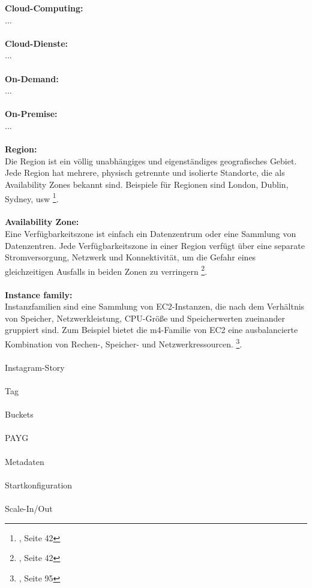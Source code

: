 

\textbf{Cloud-Computing:}\\
...
\\\\
\textbf{Cloud-Dienste:}\\
...
\\\\
\textbf{On-Demand:}\\
...
\\\\
\textbf{On-Premise:}\\
...
\\\\
\textbf{Region:}\\
Die Region ist ein völlig unabhängiges und eigenständiges geografisches Gebiet. Jede Region hat mehrere, physisch getrennte und isolierte Standorte, die als Availability Zones bekannt sind. Beispiele für Regionen sind London, Dublin, Sydney, usw \footnote{\cite{AWS1}, Seite 42}.
\\\\
\textbf{Availability Zone:}\\
Eine Verfügbarkeitszone ist einfach ein Datenzentrum oder eine Sammlung von Datenzentren. Jede Verfügbarkeitszone in einer Region verfügt über eine separate Stromversorgung, Netzwerk und Konnektivität, um die Gefahr eines gleichzeitigen Ausfalls in beiden Zonen zu verringern \footnote{\cite{AWS1}, Seite 42}.
\\\\

\textbf{Instance family:}\\
Instanzfamilien sind eine Sammlung von EC2-Instanzen, die nach dem Verhältnis von Speicher, Netzwerkleistung, CPU-Größe und Speicherwerten zueinander gruppiert sind. Zum Beispiel bietet die m4-Familie von EC2 eine ausbalancierte Kombination von Rechen-, Speicher- und Netzwerkressourcen. \footnote{\cite{AWS1}, Seite 95}.
\\\\
Instagram-Story
\\\\
Tag
\\\\
Buckets
\\\\
PAYG %
\\\\
Metadaten
\\\\
Startkonfiguration %
\\\\
Scale-In/Out
